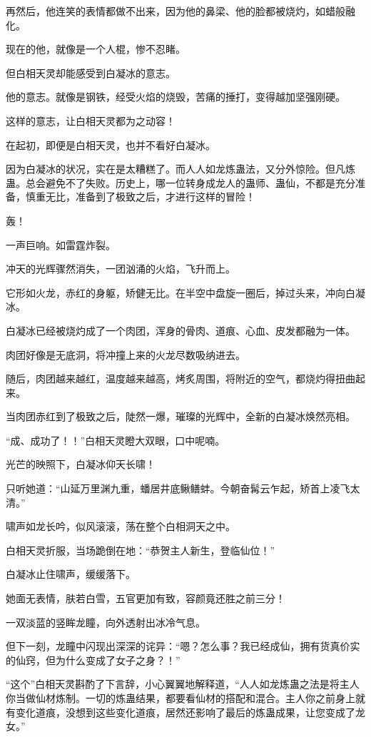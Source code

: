 \begin{this_body}
再然后，他连笑的表情都做不出来，因为他的鼻梁、他的脸都被烧灼，如蜡般融化。

现在的他，就像是一个人棍，惨不忍睹。

但白相天灵却能感受到白凝冰的意志。

他的意志。就像是钢铁，经受火焰的烧毁，苦痛的捶打，变得越加坚强刚硬。

这样的意志，让白相天灵都为之动容！

在起初，即便是白相天灵，也并不看好白凝冰。

因为白凝冰的状况，实在是太糟糕了。而人人如龙炼蛊法，又分外惊险。但凡炼蛊。总会避免不了失败。历史上，哪一位转身成龙人的蛊师、蛊仙，不都是充分准备，慎重无比，准备到了极致之后，才进行这样的冒险！

轰！

一声巨响。如雷霆炸裂。

冲天的光辉骤然消失，一团汹涌的火焰，飞升而上。

它形如火龙，赤红的身躯，矫健无比。在半空中盘旋一圈后，掉过头来，冲向白凝冰。

白凝冰已经被烧灼成了一个肉团，浑身的骨肉、道痕、心血、皮发都融为一体。

肉团好像是无底洞，将冲撞上来的火龙尽数吸纳进去。

随后，肉团越来越红，温度越来越高，烤炙周围，将附近的空气，都烧灼得扭曲起来。

当肉团赤红到了极致之后，陡然一爆，璀璨的光辉中，全新的白凝冰焕然亮相。

“成、成功了！！”白相天灵瞪大双眼，口中呢喃。

光芒的映照下，白凝冰仰天长啸！

只听她道：“山延万里渊九重，蟠居井底鳅鳝蚌。今朝奋髯云乍起，矫首上凌飞太清。”

啸声如龙长吟，似风滚滚，荡在整个白相洞天之中。

白相天灵折服，当场跪倒在地：“恭贺主人新生，登临仙位！”

白凝冰止住啸声，缓缓落下。

她面无表情，肤若白雪，五官更加有致，容颜竟还胜之前三分！

一双淡蓝的竖眸龙瞳，向外透射出冰冷气息。

但下一刻，龙瞳中闪现出深深的诧异：“嗯？怎么事？我已经成仙，拥有货真价实的仙窍，但为什么变成了女子之身？！”

“这个”白相天灵斟酌了下言辞，小心翼翼地解释道，“人人如龙炼蛊之法是将主人你当做仙材炼制。一切的炼蛊结果，都要看仙材的搭配和混合。主人你之前身上就有变化道痕，没想到这些变化道痕，居然还影响了最后的炼蛊成果，让您变成了龙女。”


\end{this_body}
